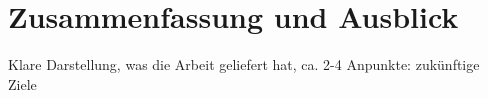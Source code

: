 \chapter{Zusammenfassung und Ausblick}

Klare Darstellung, was die Arbeit geliefert hat, ca. 2-4 Anpunkte: zukünftige Ziele 